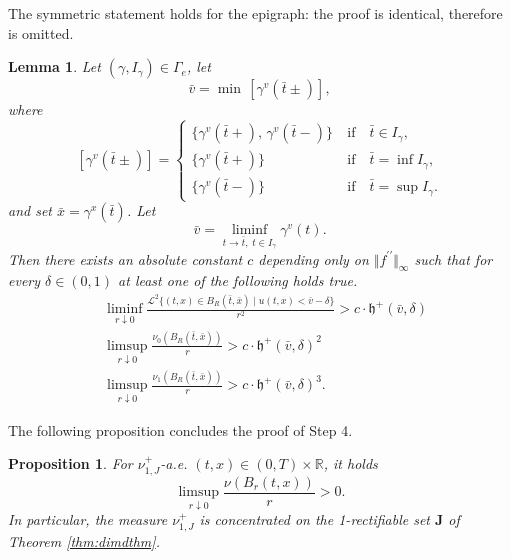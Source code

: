 \documentclass[11pt, twoside, reqno]{amsart}
\newtheorem{prop}[thm]{Proposition}
\newtheorem{lemma}[thm]{Lemma}
\theoremstyle{definition}
\theoremstyle{remark}
\numberwithin{equation}{section}
\newcommand{\second}{{\prime \prime}}
\newcommand{\msc}[1]{\mathscr{#1}}
\begin{document}
The symmetric statement holds for the epigraph: the proof is identical, therefore is omitted. 
\begin{lemma}\label{lemma:epireg}
    Let $(\gamma, I_{\gamma}) \in \Gamma_e$,  let $$\bar v = \min\, [\gamma^v(\bar t\pm)],
$$
    where 
    $$
    [\gamma^v(\bar t\pm)]=
    \begin{cases}
      \{\gamma^v(\bar t+),\, \gamma^v(\bar t-)\}
        \  &\text{if}\quad  \bar t \in I_{\gamma},
        \\
        \{\gamma^v(\bar t+)\}
        \   &\text{if}\quad  \bar t = \inf I_\gamma,
        \\
        \{\gamma^v(\bar t-)\}
        \   &\text{if}\quad  \bar t = \sup I_\gamma.
    \end{cases}
    $$
    and set $\bar x = \gamma^x(\bar t)$. Let $$\bar v =\liminf_{t \to \bar t, \; t \in I_\gamma} \gamma^v(t).$$ Then there exists an absolute constant $c$ depending only on $\Vert f^{\second}\Vert_{\infty}$ such that  for every $\delta \in (0, 1)$ at least one of the following holds true.
    \begin{equation}
    \begin{aligned}
       &  \liminf _{r \downarrow 0} \frac{\msc L^2 \big\{(t, x) \in B_R(\bar t, \bar x) \; \big| \; u(t,x) < \bar v-\delta\big\}}{r^2} > c \cdot \mathfrak h^+(\bar v, \delta)\\
   & \limsup_{r \downarrow 0} \frac{\nu_0(B_R(\bar t, \bar x))}{r} > c \cdot \mathfrak h^+(\bar v, \delta)^2\\
   & \limsup_{r \downarrow 0} \frac{\nu_1(B_R(\bar t, \bar x))}{r} > c \cdot \mathfrak h^+(\bar v, \delta)^3.
        \end{aligned}
\end{equation}
\end{lemma}
The following proposition concludes the proof of Step 4.
\begin{prop}\label{prop:notvmo}
For $\nu^+_{1, J}$-a.e. $(t, x) \in (0, T) \times \mathbb R$, it holds
\begin{equation}
    \limsup_{r \downarrow 0} \frac{\nu(B_r(t, x))}{r} > 0.
\end{equation}
    In particular, the measure $\nu^+_{1,J}$ is concentrated on the 1-rectifiable set $\mathbf J$ of Theorem \ref{thm:dimdthm}. 
\end{prop}
\end{document}
